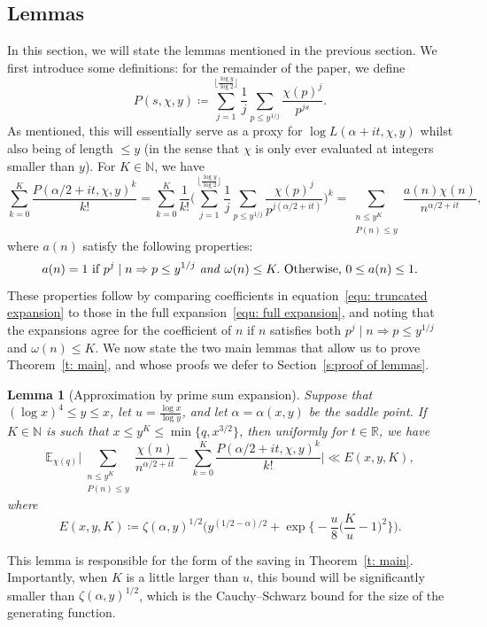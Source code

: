 \documentclass[a4paper,12pt,reqno]{amsart}
\newtheorem{lemma}{Lemma}
\newcommand{\N}{\mathbb{N}}
\newcommand{\R}{\mathbb{R}}
\newcommand{\E}{\mathbb{E}}
\begin{document}
\subsection{Lemmas}
In this section, we will state the lemmas mentioned in the previous section. We first introduce some definitions: for the remainder of the paper, we define
\begin{equation}\label{equ: defn of P}
P (s, \chi, y) \coloneqq \sum_{j = 1}^{\lfloor \frac{\log y}{\log 2} \rfloor} \frac{1}{j} \sum_{p \leq y^{1/j}} \frac{\chi(p)^j}{p^{js}}.
\end{equation}
As mentioned, this will essentially serve as a proxy for $\log L ( \alpha + it, \chi, y )$ whilst also being of length $\leq y$ (in the sense that $\chi$ is only ever evaluated at integers smaller than $y$). For $K \in \N$, we have
\begin{equation}\label{equ: truncated expansion}
\sum_{k=0}^{K} \frac{P(\alpha/2 + it, \chi, y)^k}{k!} = \sum_{k=0}^{K} \frac{1}{k!} \biggl( \sum_{j = 1}^{\lfloor \frac{\log y}{\log 2} \rfloor} \frac{1}{j} \sum_{p \leq y^{1/j}} \frac{\chi(p)^j}{p^{j(\alpha / 2 + it)}} \biggr)^k = \sum_{\substack{n \leq y^K \\ P(n) \leq y}} \frac{a(n) \chi(n)}{n^{\alpha/2+it}},
\end{equation}
where $a(n)$ satisfy the following properties:
\begin{equation}\label{equ: a(n) properties}
a(n) = 1 \text{ if } p^j \mid n \Rightarrow p \leq y^{1/j} \text{ \emph{and} } \omega(n) \leq K. \text{ Otherwise, } 0 \leq a(n) \leq 1.
\end{equation}
These properties follow by comparing coefficients in equation~\eqref{equ: truncated expansion} to those in the full expansion~\eqref{equ: full expansion}, and noting that the expansions agree for the coefficient of $n$ if $n$ satisfies both $p^j \mid n \Rightarrow p \leq y^{1/j}$ and $\omega(n) \leq K$. We now state the two main lemmas that allow us to prove Theorem~\ref{t: main}, and whose proofs we defer to Section~\ref{s:proof of lemmas}. 
\pagebreak
\begin{lemma}[Approximation by prime sum expansion]\label{l: good generating function}
Suppose that $(\log x)^4 \leq y \leq x$, let $u = \frac{\log x}{\log y}$, and let $\alpha = \alpha (x,y) $ be the saddle point. If $K \in \N$ is such that $x \leq y^K \leq \min \{ q, x^{3/2} \}$, then uniformly for $t \in \R$, we have
\[
\E_{\chi (q)} \biggl| \sum_{\substack{n \leq y^K \\ P(n) \leq y}} \frac{\chi(n)}{n^{\alpha / 2 + it}} - \sum_{k = 0}^{K} \frac{P (\alpha / 2 + it, \chi, y)^{k}}{k!} \biggr| \ll E (x, y, K), 
\]
where
\[
E (x, y, K) \coloneqq \zeta (\alpha, y)^{1/2} \biggl(y^{(1/2 - \alpha)/2} + \exp \biggl\{ - \frac{u}{8} \biggl( \frac{K}{u} -1 \biggr)^2 \biggr\} \biggr).
\]
\end{lemma}
This lemma is responsible for the form of the saving in Theorem~\ref{t: main}. Importantly, when $K$ is a little larger than $u$, this bound will be significantly smaller than $\zeta (\alpha, y)^{1/2}$, which is the Cauchy--Schwarz bound for the size of the generating function.
\end{document}

